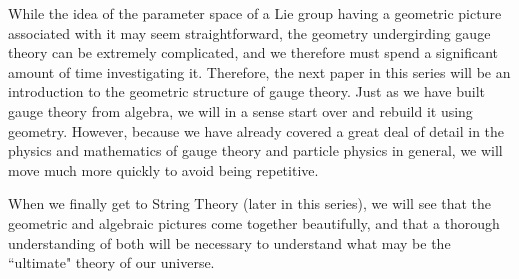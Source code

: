 \documentclass[12pt,epsf]{article}
\begin{document}
While the idea of the parameter space of a Lie group having a geometric
picture associated with it may seem straightforward, the geometry
undergirding gauge theory can be extremely complicated, and we
therefore must spend a significant amount of time investigating it. 
Therefore, the next paper in this series will be an introduction to the
geometric structure of gauge theory.  Just as we have built gauge
theory from algebra, we will in a sense start over and rebuild it using
geometry.  However, because we have already covered a great deal of
detail in the physics and mathematics of gauge theory and particle
physics in general, we will move much more quickly to avoid being
repetitive. 

When we finally get to String Theory (later in this series), we will
see that the geometric and algebraic pictures come together
beautifully, and that a thorough understanding of both will be
necessary to understand what may be the ``ultimate" theory of our
universe. 

\newpage
\end{document}
